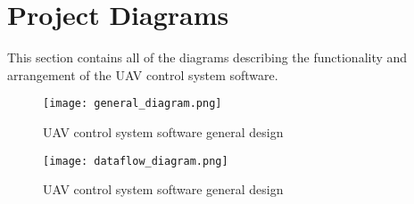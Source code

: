 \documentclass[titlepage]{article}
\begin{document}
\section{Project Diagrams}
This section contains all of the diagrams describing the functionality and arrangement of the UAV control system software. 

\begin{figure}[h]
\begin{center}
\texttt{[image: general\_diagram.png]}
\caption{UAV control system software general design}
\end{center}
\end{figure}

\begin{figure}[h]
\begin{center}
\texttt{[image: dataflow\_diagram.png]}
\caption{UAV control system software general design}
\end{center}
\end{figure}

\clearpage
{}
\printindex
\end{document}
